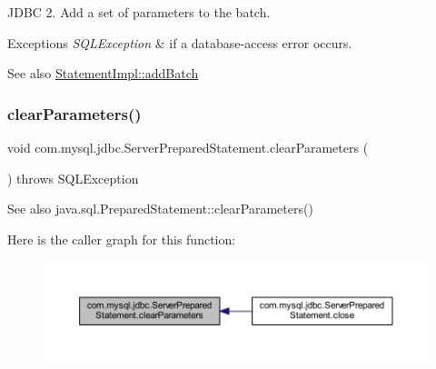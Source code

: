 J\+D\+BC 2. Add a set of parameters to the batch.


\begin{DoxyExceptions}{Exceptions}
{\em S\+Q\+L\+Exception} & if a database-\/access error occurs.\\
\hline
\end{DoxyExceptions}
\begin{DoxySeeAlso}{See also}
\mbox{\hyperlink{classcom_1_1mysql_1_1jdbc_1_1_statement_impl_a3ea3c4f24a3d1c9d4f9f9a9d29e53a02}{Statement\+Impl\+::add\+Batch}} 
\end{DoxySeeAlso}
\mbox{\label{classcom_1_1mysql_1_1jdbc_1_1_server_prepared_statement_a7c1e2ab709b4d6734375679c471a2c9d}} 
\subsubsection{\texorpdfstring{clear\+Parameters()}{clearParameters()}}
{\footnotesize\ttfamily void com.\+mysql.\+jdbc.\+Server\+Prepared\+Statement.\+clear\+Parameters (\begin{DoxyParamCaption}{ }\end{DoxyParamCaption}) throws S\+Q\+L\+Exception}

\begin{DoxySeeAlso}{See also}
java.\+sql.\+Prepared\+Statement\+::clear\+Parameters() 
\end{DoxySeeAlso}
Here is the caller graph for this function\+:
\nopagebreak
\begin{figure}[H]
\begin{center}
\leavevmode
\includegraphics[width=350pt]{classcom_1_1mysql_1_1jdbc_1_1_server_prepared_statement_a7c1e2ab709b4d6734375679c471a2c9d_icgraph}
\end{center}
\end{figure}
\mbox{\label{classcom_1_1mysql_1_1jdbc_1_1_server_prepared_statement_a2d447ecd02f6f318e320d5c33ebfa780}} 
